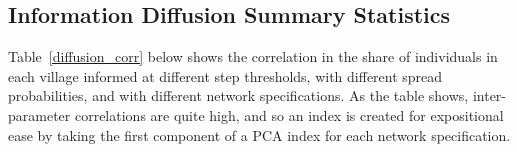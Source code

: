 \documentclass[12pt]{article}
\begin{document}
\begin{appendix}
\subsection{Information Diffusion Summary Statistics}
Table~\ref{diffusion_corr} below shows the correlation in the share of individuals in each village informed at different step thresholds, with different spread probabilities, and with different network specifications. As the table shows, inter-parameter correlations are quite high, and so an index is created for expositional ease by taking the first component of a PCA index for each network specification.

\begin{landscape}
    
\end{landscape}






\end{appendix}
\end{document}
